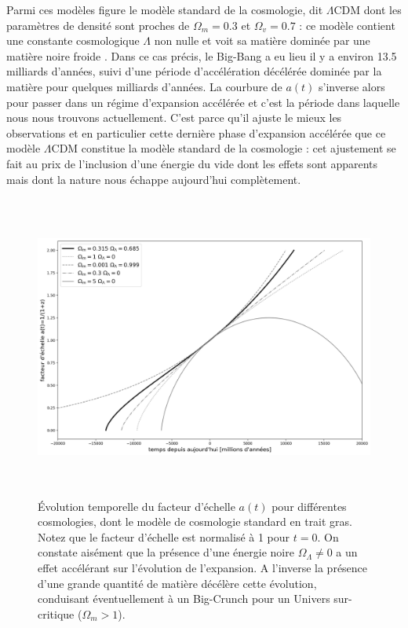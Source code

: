 Parmi ces modèles figure le modèle standard de la cosmologie, dit $\Lambda$CDM dont les paramètres de densité sont proches de $\Omega_m=0.3$ et $\Omega_v=0.7$ : ce modèle contient une constante cosmologique $\Lambda$ non nulle et voit sa matière dominée par une matière noire froide .  Dans ce cas précis, le Big-Bang a eu lieu il y a environ 13.5 milliards d'années, suivi d'une période d'accélération décélérée dominée par la matière pour quelques milliards d'années. La courbure de $a(t)$ s'inverse alors pour passer dans un régime d'expansion accélérée et c'est la période dans laquelle nous nous trouvons actuellement.  C'est parce qu'il ajuste le mieux les observations et en particulier cette dernière phase d'expansion accélérée que ce modèle $\Lambda$CDM constitue la modèle standard de la cosmologie : cet ajustement se fait au prix de l'inclusion d'une énergie du vide dont les effets sont apparents mais dont la nature nous échappe aujourd'hui complètement.

\begin{figure}[htbp]
	\centering
		\includegraphics[height=10cm]{figs/a2t_cosmo.png}
	\caption[Facteur d'échelle pour différentes cosmologie]{Évolution temporelle du facteur d'échelle $a(t)$ pour différentes cosmologies, dont le modèle de cosmologie standard en trait gras. Notez que le facteur d'échelle est normalisé à 1 pour $t=0$. On constate aisément que la présence d'une énergie noire $\Omega_\Lambda \ne 0$ a un effet accélérant sur l'évolution de l'expansion. A l'inverse la présence d'une grande quantité de matière décélère cette évolution, conduisant éventuellement à un Big-Crunch pour un Univers sur-critique ($\Omega_m>1$).}
	\label{f:aexpcosmo}
\end{figure}

